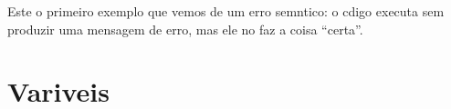 

Este   o primeiro exemplo que vemos de um erro sem ntico: o c digo 
executa sem produzir uma mensagem de erro, mas ele n o faz a 
coisa ``certa''.

\section{Vari veis}


